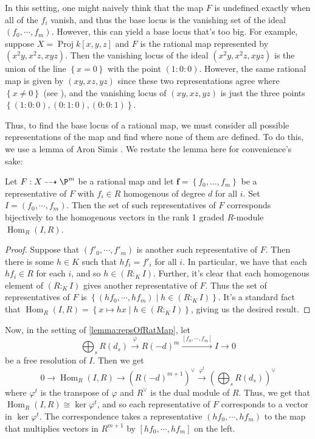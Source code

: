 \documentclass[12pt]{amsart}
\numberwithin{equation}{theorem}
\renewcommand{\:}{\colon}
\DeclareMathOperator{\homgp}{Hom}
\DeclareMathOperator{\Projfnc}{Proj} %
\theoremstyle{theorem}
\begin{document}
In this setting, one might naively think that the map $F$ is undefined exactly when all of the $f_i$ vanish, and thus the base locus is the vanishing set of the ideal $(f_0, \cdots, f_m)$. However, this can yield a base locus that's too big. For example, suppose $X = \Projfnc k[x, y, z]$ and $F$ is the rational map represented by $(x^2y, x^2z, xyz)$. Then the vanishing locus of the ideal $(x^2y, x^2z, xyz)$ is the union of the line $\left\{ x = 0 \right\}$ with the point $(1:0:0)$. However, the same rational map is given by $(xy, xz, yz)$ since these two representations agree where $\left\{ x\neq 0 \right\}$ (see \cite[I.4]{Hartshorne}), and the vanishing locus of $(xy, xz, yz)$ is just the three points $\left\{ (1:0:0), (0:1:0), (0:0:1) \right\}$. 

Thus, to find the base locus of a rational map, we must consider all possible representations of the map and find where none of them are defined. To do this, we use a lemma of Aron Simis \cite[Proposition 1.1]{SimisCremona}. We restate the lemma here for convenience's sake: 

% 

\begin{lemma}
  Let $F: X \dashrightarrow \P^m$ be a rational map and let $\textbf{f} = \left\{ f_0, \dots, f_m \right\}$ be a representative of $F$ with $f_i\in R$ homogenous of degree $d$ for all $i$. Set $I  = (f_0, \cdots, f_m)$. Then the set of such representatives of $F$ corresponds bijectively to the homogenous vectors in the rank 1 graded $R$-module $\homgp_R(I, R)$.
  \label{lemma:repsOfRatMap}
\end{lemma}
\begin{proof}
  Suppose that $(f'_0, \cdots, f'_m)$ is another such representative of $F$. Then there is some $h\in K$ such that $hf_i = f'_i$ for all $i$. In particular, we have that each $hf_i \in R$ for each $i$, and so $h\in \left( R :_K I \right)$. Further, it's clear that each homogenous element of $\left( R :_K I \right)$ gives another representative of $F$. Thus the set of representatives of $F$ is $\left\{ (h f_0, \cdots, hf_m)\mid h\in \left( R :_K I \right) \right\}$. It's a standard fact that $\homgp_R(I, R) = \left\{ x\mapsto hx \mid h\in (R :_K I) \right\}$, giving us the desired result. 
\end{proof}

Now, in the setting of \ref{lemma:repsOfRatMap}, let
  \[
    \bigoplus_s R(d_s) \xrightarrow{\varphi} R(-d)^m \xrightarrow{[f_0, \cdots, f_m]} I \to 0 
  \]
be a free resolution of $I$. Then we get
\[
  0 \to \homgp_R(I, R) \to \left( R(-d)^{m+1} \right)^\vee \xrightarrow{\varphi^t} \left( \bigoplus_s R(d_s) \right)^\vee 
\]
where $\varphi^t$ is the transpose of $\varphi$ and $R^\vee$ is the dual module of $R$. Thus, we get that $\homgp_R(I,R) \cong \ker \varphi^t$, and so each representative of $F$ corresponds to a vector in $\ker \varphi^t$. The correspondence takes a representative $(hf_0, \cdots, hf_m)$ to the map that multiplies vectors in $R^{m+1}$ by $[hf_0, \cdots, hf_m]$ on the left.
\end{document}
